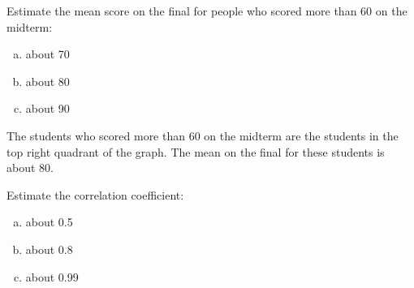 \documentclass[letterpaper, landscape]{exam}
\begin{document}
  \begin{questions}
    






    \question[3] Estimate the mean score on the final for people who scored more than
      60 on the midterm:\label{q:exams.first}

      \begin{enumerate}[(a)]
        \item about 70
        \item about 80
        \item about 90
      \end{enumerate}

      \begin{solution}
        The students who scored more than 60 on the midterm are the students in the
        top right quadrant of the graph.  The mean on the final for these
        students is about 80.
      \end{solution}

    \question[3] Estimate the correlation coefficient:
      \begin{enumerate}[(a)]
        \item about 0.5
        \item about 0.8
        \item about 0.99
      \end{enumerate}


\end{questions}
\end{document}
